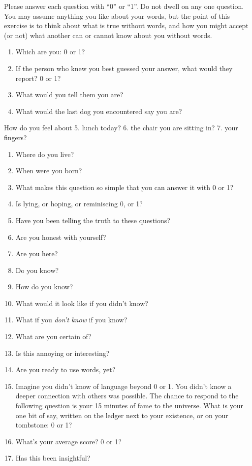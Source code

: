 \documentclass[
]{book}
\providecommand{\tightlist}{%
  \setlength{\itemsep}{0pt}\setlength{\parskip}{0pt}}
\begin{document}
Please answer each question with ``0'' or ``1''.
Do not dwell on any one question.
You may assume anything you like about your words,
but the point of this exercise is to think about what is true without words, and how you might accept (or not)
what another can or cannot know about you without words.

\begin{enumerate}
\def\labelenumi{\arabic{enumi}.}
\tightlist
\item
  Which are you: 0 or 1?
\item
  If the person who knew you best guessed your answer,
  what would they report? 0 or 1?
\item
  What would you tell them you are?
\item
  What would the last dog you encountered say you are?
\end{enumerate}

How do you feel about
5. lunch today?
6. the chair you are sitting in?
7. your fingers?

\begin{enumerate}
\def\labelenumi{\arabic{enumi}.}
\setcounter{enumi}{7}
\item
  Where do you live?
\item
  When were you born?
\item
  What makes this question so simple that you can answer it
  with 0 or 1?
\item
  Is lying, or hoping, or reminiscing 0, or 1?
\item
  Have you been telling the truth to these questions?
\item
  Are you honest with yourself?
\item
  Are you here?
\item
  Do you know?
\item
  How do you know?
\item
  What would it look like if you didn't know?
\item
  What if you \emph{don't know} if you know?
\item
  What are you certain of?
\item
  Is this annoying or interesting?
\item
  Are you ready to use words, yet?
\item
  Imagine you didn't know of language beyond 0 or 1.
  You didn't know a deeper connection with others was possible.
  The chance to respond to the following question is
  your 15 minutes of fame to the universe.
  What is your one bit of say,
  written on the ledger next to your existence, or
  on your tombstone: 0 or 1?
\item
  What's your average score? 0 or 1?
\item
  Has this been insightful?
\end{enumerate}
\end{document}
